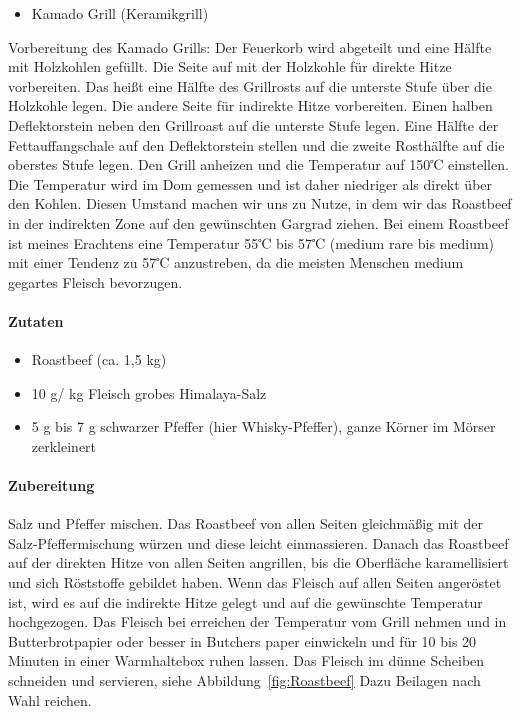\begin{itemize}[noitemsep]
	\item Kamado Grill (Keramikgrill)
\end{itemize}


Vorbereitung des Kamado Grills: Der Feuerkorb wird abgeteilt und eine Hälfte
mit Holzkohlen gefüllt. Die Seite auf mit der 
Holzkohle für direkte Hitze
vorbereiten. Das heißt eine Hälfte des Grillrosts auf die unterste Stufe 
über die Holzkohle legen. Die andere Seite für indirekte Hitze vorbereiten. 
Einen halben Deflektorstein neben den Grillroast auf die unterste Stufe 
legen. Eine Hälfte der Fettauffangschale auf den Deflektorstein stellen 
und die zweite Rosthälfte auf die oberstes Stufe legen. Den Grill anheizen 
und die Temperatur auf 150℃ einstellen. Die Temperatur wird im Dom 
gemessen
und ist daher niedriger als direkt über den Kohlen. Diesen Umstand 
machen
wir uns zu Nutze, in dem wir das Roastbeef in der indirekten Zone auf den
gewünschten Gargrad ziehen. Bei einem Roastbeef ist meines Erachtens
eine Temperatur 55℃ bis 57℃ (medium rare bis medium) mit einer 
Tendenz
zu 57℃ anzustreben, da die meisten Menschen medium gegartes Fleisch
bevorzugen.

\paragraph{Zutaten}

\begin{itemize}[noitemsep]
	\item Roastbeef (ca. 1,5 kg)
	\item 10 g/ kg Fleisch grobes Himalaya-Salz
	\item 5 g bis 7 g schwarzer Pfeffer (hier Whisky-Pfeffer), ganze Körner 
	im Mörser zerkleinert
\end{itemize}

\paragraph{Zubereitung}

Salz und Pfeffer mischen. Das Roastbeef von allen Seiten gleichmäßig mit 
der Salz-Pfeffermischung würzen und diese leicht einmassieren. Danach
das Roastbeef auf der direkten Hitze von allen Seiten angrillen, bis die
Oberfläche karamellisiert und sich Röststoffe gebildet haben. Wenn das
Fleisch auf allen Seiten angeröstet ist, wird es auf die indirekte Hitze 
gelegt
und auf die gewünschte Temperatur hochgezogen. Das Fleisch bei 
erreichen
der Temperatur vom Grill nehmen und in Butterbrotpapier oder besser in
Butchers paper einwickeln und für 10 bis 20 Minuten in einer 
Warmhaltebox
ruhen lassen. Das Fleisch im dünne Scheiben schneiden und servieren, 
siehe Abbildung~\vref{fig:Roastbeef}
Dazu Beilagen nach Wahl reichen.

